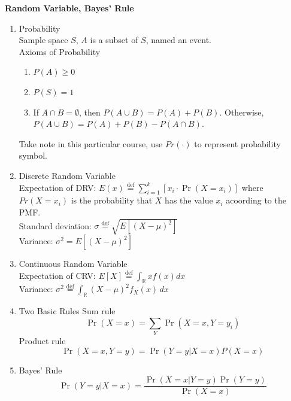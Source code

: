 \documentclass{article}
\begin{document}
\textbf{Random Variable, Bayes' Rule}
\begin{enumerate}
    \item Probability \\
    Sample space $S$, $A$ is a subset of $S$, named an event. \\
    Axioms of Probability
    \begin{enumerate}
        \item $P(A) \geq 0$
        \item $P(S) = 1$
        \item If $A \cap B = \emptyset$, then $P(A \cup B) = P(A) + P(B)$. Otherwise, $P(A \cup B) = P(A) + P(B) - P(A \cap B)$.
    \end{enumerate} 
    Take note in this particular course, use $Pr(\cdot)$ to represent probability symbol.
    \item Discrete Random Variable \\
    Expectation of DRV: \(E(x) \overset{\text{def}}{=} \sum_{i=1}^{k} [x_i \cdot \Pr(X = x_i)]\)
    where $Pr(X = x_i)$ is the probability that $X$ has the value $x_i$ acoording to the PMF.\\
    Standard deviation: \(\sigma \overset{\text{def}}{=} \sqrt{E\left[(X - \mu)^2\right]}\) \\
    Variance: \(\sigma^2 = E\left[(X - \mu)^2\right]\) \\
    \item Continuous Random Variable \\
    Expectation of CRV: \(E[X] \overset{\text{def}}{=} \int_{\mathbb{R}} xf(x)dx\) \\
    Variance: \(\sigma^2 \overset{\text{def}}{=} \int_{\mathbb{R}} (X - \mu)^2 f_X(x) \, dx\) \\
    \item Two Basic Rules
    Sum rule
    \[\Pr(X = x) = \sum_{Y} \Pr(X = x, Y = y_i)\]
    Product rule
    \[\Pr(X = x, Y = y) = \Pr(Y = y | X = x) P(X = x)\]
    \item Bayes' Rule
    \[\Pr(Y = y | X = x) = \frac{\Pr(X = x | Y = y) \Pr(Y = y)}{\Pr(X = x)}\]
\end{enumerate}
\end{document}
